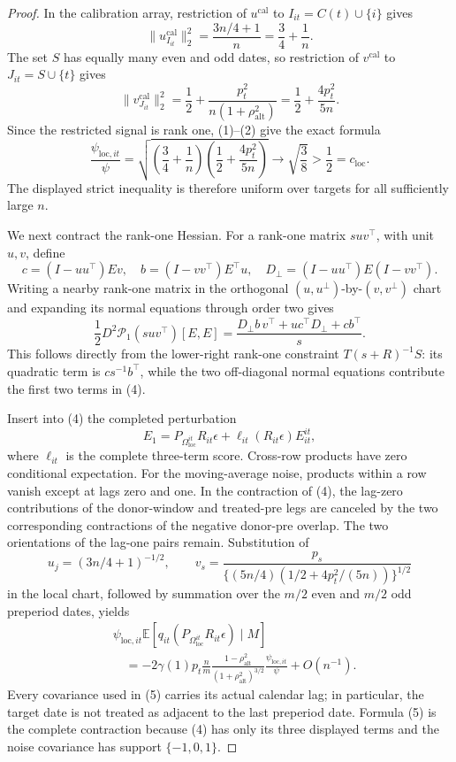 \documentclass{article}
\begin{document}
\begin{proof}
In the calibration array, restriction of \(u^{\mathrm{cal}}\) to \(I_{it}=C(t)\cup\{i\}\) gives
\[
 \|u^{\mathrm{cal}}_{I_{it}}\|_2^2
 =\frac{3n/4+1}{n}=\frac34+\frac1n.
 \tag{1}
\]
The set \(S\) has equally many even and odd dates, so restriction of \(v^{\mathrm{cal}}\) to \(J_{it}=S\cup\{t\}\) gives
\[
 \|v^{\mathrm{cal}}_{J_{it}}\|_2^2
 =\frac12+\frac{p_t^2}{n(1+\rho_{\mathrm{alt}}^2)}
 =\frac12+\frac{4p_t^2}{5n}.
 \tag{2}
\]
Since the restricted signal is rank one, (1)--(2) give the exact formula
\[
 \frac{\psi_{\mathrm{loc},it}}\psi
 =\sqrt{\left(\frac34+\frac1n\right)
 \left(\frac12+\frac{4p_t^2}{5n}\right)}
 \longrightarrow\sqrt{\frac38}>\frac12=c_{\mathrm{loc}}.
 \tag{3}
\]
The displayed strict inequality is therefore uniform over targets for all sufficiently large \(n\).

We next contract the rank-one Hessian.  For a rank-one matrix \(suv^{\top}\), with unit \(u,v\), define
\[
 c=(I-uu^{\top})Ev,
 \quad b=(I-vv^{\top})E^{\top}u,
 \quad D_\perp=(I-uu^{\top})E(I-vv^{\top}).
\]
Writing a nearby rank-one matrix in the orthogonal \((u,u^\perp)\)-by-\((v,v^\perp)\) chart and expanding its normal equations through order two gives
\[
 \frac12D^2\mathcal P_1(suv^{\top})[E,E]
 =\frac{D_\perp b\,v^{\top}+uc^{\top}D_\perp+cb^{\top}}s.
 \tag{4}
\]
This follows directly from the lower-right rank-one constraint
\(T(s+R)^{-1}S\): its quadratic term is \(cs^{-1}b^{\top}\), while the two off-diagonal normal equations contribute the first two terms in (4).

Insert into (4) the completed perturbation
\[
 E_1=P_{\Omega_{\mathrm{loc}}^{it}}R_{it}\epsilon
 +\ell_{it}(R_{it}\epsilon)E^{it}_{it},
\]
where \(\ell_{it}\) is the complete three-term score.  Cross-row products have zero conditional expectation.  For the moving-average noise, products within a row vanish except at lags zero and one.  In the contraction of (4), the lag-zero contributions of the donor-window and treated-pre legs are canceled by the two corresponding contractions of the negative donor-pre overlap.  The two orientations of the lag-one pairs remain.  Substitution of
\[
 u_j=(3n/4+1)^{-1/2},
 \qquad
 v_s=\frac{p_s}{\{(5n/4)(1/2+4p_t^2/(5n))\}^{1/2}}
\]
in the local chart, followed by summation over the \(m/2\) even and \(m/2\) odd preperiod dates, yields
\[
 \begin{aligned}
 &\psi_{\mathrm{loc},it}
 \mathbb E\!\left[q_{it}(P_{\Omega_{\mathrm{loc}}^{it}}R_{it}\epsilon)\mid M\right]\\
 &\quad=-2\gamma(1)p_t\frac nm
 \frac{1-\rho_{\mathrm{alt}}^2}{(1+\rho_{\mathrm{alt}}^2)^{3/2}}
 \frac{\psi_{\mathrm{loc},it}}\psi+O(n^{-1}).
 \end{aligned}
 \tag{5}
\]
Every covariance used in (5) carries its actual calendar lag; in particular, the target date is not treated as adjacent to the last preperiod date.  Formula (5) is the complete contraction because (4) has only its three displayed terms and the noise covariance has support \(\{-1,0,1\}\).


\end{proof}
\end{document}
